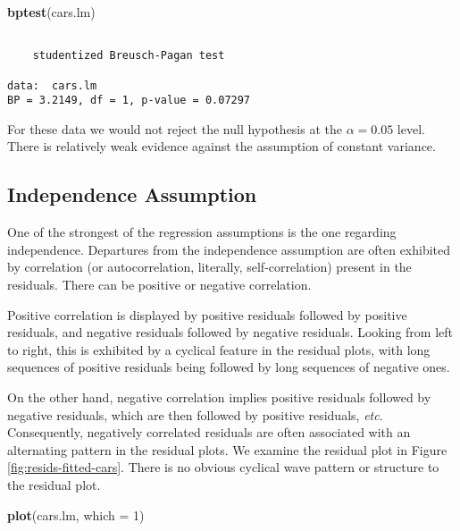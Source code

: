 \documentclass[]{book}
\newenvironment{Shaded}{\begin{snugshade}}{\end{snugshade}}
\newcommand{\KeywordTok}[1]{\textcolor[rgb]{0.13,0.29,0.53}{\textbf{{#1}}}}
\newcommand{\DataTypeTok}[1]{\textcolor[rgb]{0.13,0.29,0.53}{{#1}}}
\newcommand{\DecValTok}[1]{\textcolor[rgb]{0.00,0.00,0.81}{{#1}}}
\newcommand{\NormalTok}[1]{{#1}}
\numberwithin{equation}{chapter}
\numberwithin{figure}{chapter}
\theoremstyle{plain}
\theoremstyle{definition}
\theoremstyle{remark}
\theoremstyle{definition}
\theoremstyle{definition}
\theoremstyle{remark}
\begin{document}
\begin{Shaded}
\begin{Highlighting}[]
\KeywordTok{bptest}\NormalTok{(cars.lm)}
\end{Highlighting}
\end{Shaded}

\begin{verbatim}

    studentized Breusch-Pagan test

data:  cars.lm
BP = 3.2149, df = 1, p-value = 0.07297
\end{verbatim}

For these data we would not reject the null hypothesis at the
\(\alpha=0.05\) level. There is relatively weak evidence against the
assumption of constant variance.

\subsection{Independence Assumption}\label{sub-independence-assumption}

One of the strongest of the regression assumptions is the one regarding
independence. Departures from the independence assumption are often
exhibited by correlation (or autocorrelation, literally,
self-correlation) present in the residuals. There can be positive or
negative correlation.

Positive correlation is displayed by positive residuals followed by
positive residuals, and negative residuals followed by negative
residuals. Looking from left to right, this is exhibited by a cyclical
feature in the residual plots, with long sequences of positive residuals
being followed by long sequences of negative ones.

On the other hand, negative correlation implies positive residuals
followed by negative residuals, which are then followed by positive
residuals, \emph{etc}. Consequently, negatively correlated residuals are
often associated with an alternating pattern in the residual plots. We
examine the residual plot in Figure \ref{fig:resids-fitted-cars}. There
is no obvious cyclical wave pattern or structure to the residual plot.

\begin{Shaded}
\begin{Highlighting}[]
\KeywordTok{plot}\NormalTok{(cars.lm, }\DataTypeTok{which =} \DecValTok{1}\NormalTok{)}
\end{Highlighting}
\end{Shaded}
\end{document}
